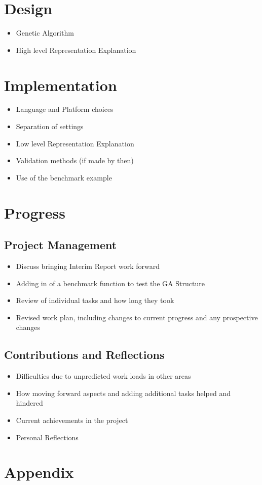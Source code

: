 \documentclass[a4paper]{article}
\begin{document}
\section{Design}
\begin{itemize}
    \item Genetic Algorithm
    \item High level Representation Explanation
\end{itemize}

\section{Implementation}
\begin{itemize}
    \item Language and Platform choices
    \item Separation of settings
    \item Low level Representation Explanation
    \item Validation methods (if made by then)
    \item Use of the benchmark example
\end{itemize}

\section{Progress}
\subsection{Project Management}
\begin{itemize}
    \item Discuss bringing Interim Report work forward
    \item Adding in of a benchmark function to test the GA Structure
    \item Review of individual tasks and how long they took
    \item Revised work plan, including changes to current progress and any prospective changes
\end{itemize}
\subsection{Contributions and Reflections}
\begin{itemize}
    \item Difficulties due to unpredicted work loads in other areas
    \item How moving forward aspects and adding additional tasks helped and hindered
    \item Current achievements in the project
    \item Personal Reflections
\end{itemize}


\section{Appendix}

\nocite{expensiveOptimisation}


\end{document}
